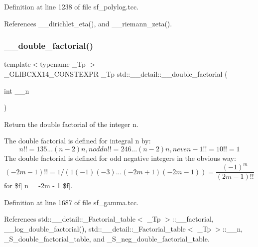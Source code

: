 Definition at line 1238 of file sf\+\_\+polylog.\+tcc.



References \+\_\+\+\_\+dirichlet\+\_\+eta(), and \+\_\+\+\_\+riemann\+\_\+zeta().

\mbox{\label{namespacestd_1_1____detail_a06b0d9786afff0919c96f61d5f760c5f}} 
\subsubsection{\texorpdfstring{\+\_\+\+\_\+double\+\_\+factorial()}{\_\_double\_factorial()}}
{\footnotesize\ttfamily template$<$typename \+\_\+\+Tp $>$ \\
\+\_\+\+G\+L\+I\+B\+C\+X\+X14\+\_\+\+C\+O\+N\+S\+T\+E\+X\+PR \+\_\+\+Tp std\+::\+\_\+\+\_\+detail\+::\+\_\+\+\_\+double\+\_\+factorial (\begin{DoxyParamCaption}\item[{int}]{\+\_\+\+\_\+n }\end{DoxyParamCaption})}



Return the double factorial of the integer n. 

The double factorial is defined for integral n by\+: \[ n!! = 1 3 5 ... (n-2) n, n odd n!! = 2 4 6 ... (n-2) n, n even -1!! = 1 0!! = 1 \] The double factorial is defined for odd negative integers in the obvious way\+: \[ (-2m - 1)!! = 1 / (1 (-1) (-3) ... (-2m + 1) (-2m - 1)) = \frac{(-1)^m}{(2m-1)!!} \] for \$f\mbox{[} n = -\/2m -\/ 1 \$f\mbox{]}. 

Definition at line 1687 of file sf\+\_\+gamma.\+tcc.



References std\+::\+\_\+\+\_\+detail\+::\+\_\+\+Factorial\+\_\+table$<$ \+\_\+\+Tp $>$\+::\+\_\+\+\_\+factorial, \+\_\+\+\_\+log\+\_\+double\+\_\+factorial(), std\+::\+\_\+\+\_\+detail\+::\+\_\+\+Factorial\+\_\+table$<$ \+\_\+\+Tp $>$\+::\+\_\+\+\_\+n, \+\_\+\+S\+\_\+double\+\_\+factorial\+\_\+table, and \+\_\+\+S\+\_\+neg\+\_\+double\+\_\+factorial\+\_\+table.

\mbox{\label{namespacestd_1_1____detail_aa349fe5bcf36d29cfacf6cd3e8aa65b0}} 
